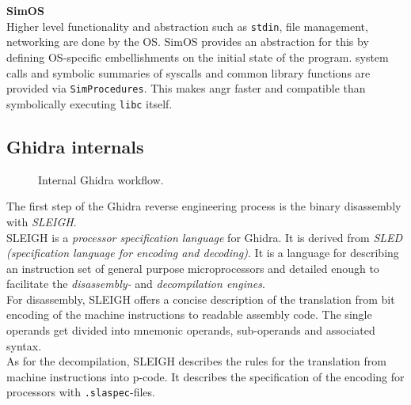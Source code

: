 \documentclass[seminar]{plai}
\begin{document}
\\\\
\textbf{SimOS}\\
Higher level functionality and abstraction such as \texttt{stdin}, file management, networking are done by the OS.
SimOS provides an abstraction for this by defining OS-specific embellishments on the initial state of the program.
system calls and symbolic summaries of \texttt{}{syscalls} and common library functions are provided via \texttt{SimProcedures}.
This makes angr faster and compatible than symbolically executing \texttt{libc} itself.

\subsection{Ghidra internals}
\label{sec:angr-internals}
\begin{figure}[htbp]
\centering
{}
\caption{Internal Ghidra workflow.\cite{formal-semantics-for-P-Code}}
\label{fig:ghidra-flow}
\end{figure}

The first step of the Ghidra reverse engineering process is the binary disassembly with \textit{SLEIGH}.\cite{formal-semantics-for-P-Code}\\
SLEIGH is a \textit{processor specification language} for Ghidra. It is derived from \textit{SLED (specification language for encoding and decoding)}.
It is a language for describing an instruction set of general purpose microprocessors and detailed enough to facilitate the \textit{disassembly-} and \textit{decompilation engines}.\\
For disassembly, SLEIGH offers a concise description of the translation from bit encoding of the machine instructions to readable assembly code. The single operands get divided into mnemonic operands, sub-operands and associated syntax.\cite{sleigh-a-language-for-rapid-processor-specification}\\
As for the decompilation, SLEIGH describes the rules for the translation from machine instructions into p-code.
It describes the specification of the encoding for processors with \texttt{.slaspec}-files.\cite{sleigh-a-language-for-rapid-processor-specification, ghidra-book-definite-guide}
\end{document}
